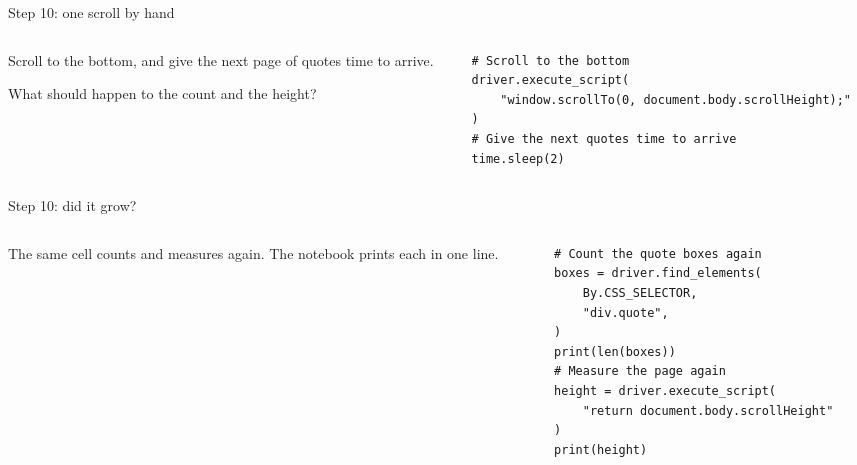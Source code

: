 \documentclass[9pt,aspectratio=169]{beamer}
\begin{document}
\begin{frame}[fragile]{Step 10: one scroll by hand}
    \begin{columns}[T]
        \begin{column}{0.37\textwidth}
            Scroll to the bottom, and give the next page of quotes time to arrive.

            \medskip
            What should happen to the count and the height?
        \end{column}
        \begin{column}{0.6\textwidth}
\begin{lstlisting}[style=lab]
# Scroll to the bottom
driver.execute_script(
    "window.scrollTo(0, document.body.scrollHeight);"
)
# Give the next quotes time to arrive
time.sleep(2)
\end{lstlisting}
        \end{column}
    \end{columns}
\end{frame}

\begin{frame}[fragile]{Step 10: did it grow?}
    \begin{columns}[T]
        \begin{column}{0.37\textwidth}
            The same cell counts and measures again. The notebook prints each in one line.
        \end{column}
        \begin{column}{0.6\textwidth}
\begin{lstlisting}[style=lab]
# Count the quote boxes again
boxes = driver.find_elements(
    By.CSS_SELECTOR,
    "div.quote",
)
print(len(boxes))
# Measure the page again
height = driver.execute_script(
    "return document.body.scrollHeight"
)
print(height)
\end{lstlisting}
        \end{column}
    \end{columns}
\end{frame}
\end{document}
